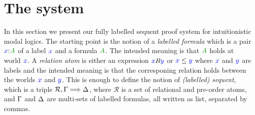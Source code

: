 \documentclass[a4paper]{article}
\theoremstyle{plain}
\theoremstyle{definition}
\newcommand{\B}{\mathcal{R}}
\newcommand{\lseq}[3]{#1 , #2 \SEQ #3}
\newcommand*{\fm}[1]{{\color{notgreen}{#1}}}
\newcommand*{\lb}[1]{{\color{blue}{#1}}}
\newcommand*{\labels}[2]{\lb{#1}\mathord{:}\fm{#2}}
\newcommand*{\accs}[2]{\lb{#1}R\lb{#2}}
\newcommand*{\futs}[2]{\lb{#1}\le{\color{blue}{#2}}}
\newcommand{\SEQ}{\Longrightarrow}
\begin{document}
\section{The system}\label{sec:system}

In this section we present our fully labelled sequent proof system
for intuitionistic modal logics. The starting point is the notion of a
\emph{labelled formula} which is a pair $\labels xA$ of a label $\lb
x$ and a formula $\fm A$. The intended meaning is that $\fm A$ holds
at world $\lb x$. A \emph{relation atom} is either an expression
$\accs xy$ or $\futs xy$ where $\lb x$ and $\lb y$ are labels and the
intended meaning is that the corresponing relation holds between the
worlds $\lb x$ and $\lb y$. This is enough to define the notion of
\emph{(labelled) sequent}, which is a triple $\lseq\B\Left\Right$,
where $\B$ is a set of relational and pre-order atoms, and $\Gamma$ and $\Delta$ are
multi-sets of labelled formulas, all written as list, separated by commas.
\end{document}
